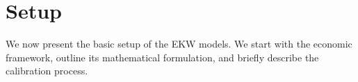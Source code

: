 \section{Setup}
We now present the basic setup of the EKW models. We start with the economic framework, outline its mathematical formulation, and briefly describe the calibration process.






